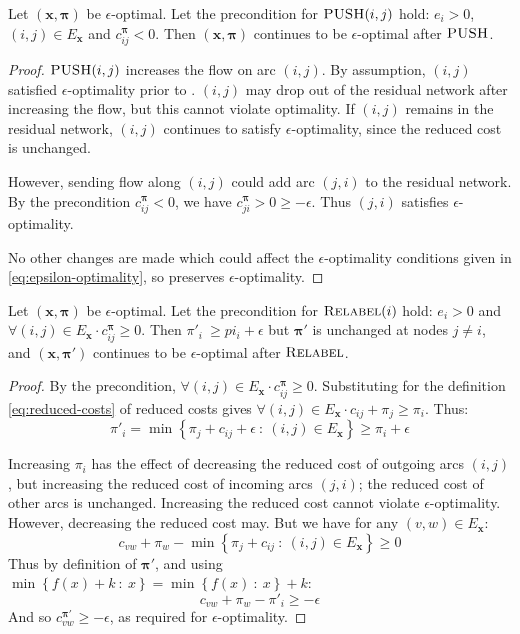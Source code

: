 \begin{lemma} \label{lemma:cost-scaling-push-correctness}
Let $\left(\mathbf{x},\boldsymbol{\pi}\right)$ be $\epsilon$-optimal. Let the precondition for $\textproc{PUSH}(i,j)$ hold: $e_i > 0$, $(i,j) \in E_{\mathbf{x}}$ and $c^{\boldsymbol{\pi}}_{ij} < 0$. Then $\left(\mathbf{x},\boldsymbol{\pi}\right)$ continues to be $\epsilon$-optimal after $\textproc{PUSH}$.
\end{lemma}
\begin{proof}
$\textproc{PUSH}(i,j)$ increases the flow on arc $(i,j)$. By assumption, $(i,j)$ satisfied $\epsilon$-optimality prior to . $(i,j)$ may drop out of the residual network after increasing the flow, but this cannot violate optimality. If $(i,j)$ remains in the residual network, $(i,j)$ continues to satisfy $\epsilon$-optimality, since the reduced cost is unchanged.

However, sending flow along $(i,j)$ could add arc $(j,i)$ to the residual network. By the precondition $c^{\boldsymbol{\pi}}_{ij} < 0$, we have $c^{\boldsymbol{\pi}}_{ji} > 0 \geq -\epsilon$. Thus $(j,i)$ satisfies $\epsilon$-optimality.

No other changes are made which could affect the $\epsilon$-optimality conditions given in \cref{eq:epsilon-optimality}, so  preserves $\epsilon$-optimality.
\end{proof}

\begin{lemma} \label{lemma:cost-scaling-relabel-correctness}
Let $\left(\mathbf{x},\boldsymbol{\pi}\right)$ be $\epsilon$-optimal. Let the precondition for $\textproc{Relabel}(i)$ hold: $e_i > 0$ and $\forall(i,j) \in E_{\mathbf{x}} \cdot c^{\boldsymbol{\pi}}_{ij} \geq 0$. Then $\pi'_i\ \geq pi_i + \epsilon$ but $\boldsymbol{\pi}'$ is unchanged at nodes $j \neq i$, and $\left(\mathbf{x},\boldsymbol{\pi}'\right)$ continues to be $\epsilon$-optimal after $\textproc{Relabel}$.
\end{lemma}
\begin{proof}
By the precondition, $\forall(i,j) \in E_{\mathbf{x}} \cdot c^{\boldsymbol{\pi}}_{ij} \geq 0$. Substituting for the definition \cref{eq:reduced-costs} of reduced costs gives $\forall(i,j) \in E_{\mathbf{x}} \cdot c_{ij} + \pi_j \geq \pi_i$. Thus:
\[\pi'_i = \min \left\{\pi_j + c_{ij} + \epsilon \::\: (i,j) \in E_{\mathbf{x}}\right\} \geq \pi_i + \epsilon\]

Increasing $\pi_i$ has the effect of decreasing the reduced cost of outgoing arcs $(i,j)$, but increasing the reduced cost of incoming arcs $(j,i)$; the reduced cost of other arcs is unchanged. Increasing the reduced cost cannot violate $\epsilon$-optimality. However, decreasing the reduced cost may. But we have for any $(v,w) \in E_{\mathbf{x}}$:
\[c_{vw} + \pi_w - \min \left\{\pi_j + c_{ij} \::\: (i,j) \in E_{\mathbf{x}}\right\} \geq 0\]
Thus by definition of $\boldsymbol{\pi}'$, and using $\min\left\{f(x) + k \::\:x\right\} = \min\left\{f(x) \::\:x\right\} + k$:
\[c_{vw} + \pi_w - \pi'_i \geq -\epsilon\]
And so $c_{vw}^{\boldsymbol{\pi}'} \geq -\epsilon$, as required for $\epsilon$-optimality.
\end{proof}

